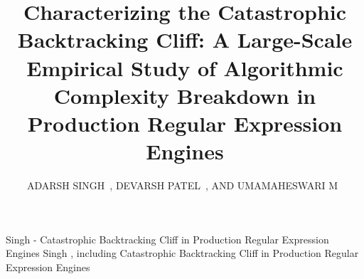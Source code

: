 \documentclass{ieeeaccess}
\begin{document}
\title{Characterizing the Catastrophic Backtracking Cliff: A Large-Scale Empirical Study of Algorithmic Complexity Breakdown in Production Regular Expression Engines}

\author{\uppercase{Adarsh Singh}\ , \uppercase{Devarsh Patel}\ , \uppercase{and Umamaheswari M}\ }
\address[1]{School of Computer Science \& Engineering, Vellore Institute of Technology (VIT), Vellore, India (e-mail: adarsh.singh2024b@vitstudent.ac.in)}
\address[2]{School of Computer Science \& Engineering, Vellore Institute of Technology (VIT), Vellore, India (e-mail: devarsh.patel2024@vitstudent.ac.in)}
\address[3]{School of Computer Science \& Engineering, Vellore Institute of Technology (VIT), Vellore, India (e-mail: umamaheswari.m@vit.ac.in)}

\markboth
{Singh \headeretal - Catastrophic Backtracking Cliff in Production Regular Expression Engines}
{Singh \headeretal, including Catastrophic Backtracking Cliff in Production Regular Expression Engines}

\end{document}

